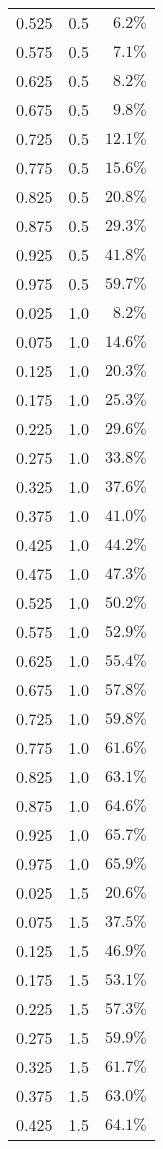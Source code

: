 \begin{longtable}{rrr}
0.525 & 0.5 & $6.2\%$ \\ 
0.575 & 0.5 & $7.1\%$ \\ 
0.625 & 0.5 & $8.2\%$ \\ 
0.675 & 0.5 & $9.8\%$ \\ 
0.725 & 0.5 & $12.1\%$ \\ 
0.775 & 0.5 & $15.6\%$ \\ 
0.825 & 0.5 & $20.8\%$ \\ 
0.875 & 0.5 & $29.3\%$ \\ 
0.925 & 0.5 & $41.8\%$ \\ 
0.975 & 0.5 & $59.7\%$ \\ 
0.025 & 1.0 & $8.2\%$ \\ 
0.075 & 1.0 & $14.6\%$ \\ 
0.125 & 1.0 & $20.3\%$ \\ 
0.175 & 1.0 & $25.3\%$ \\ 
0.225 & 1.0 & $29.6\%$ \\ 
0.275 & 1.0 & $33.8\%$ \\ 
0.325 & 1.0 & $37.6\%$ \\ 
0.375 & 1.0 & $41.0\%$ \\ 
0.425 & 1.0 & $44.2\%$ \\ 
0.475 & 1.0 & $47.3\%$ \\ 
0.525 & 1.0 & $50.2\%$ \\ 
0.575 & 1.0 & $52.9\%$ \\ 
0.625 & 1.0 & $55.4\%$ \\ 
0.675 & 1.0 & $57.8\%$ \\ 
0.725 & 1.0 & $59.8\%$ \\ 
0.775 & 1.0 & $61.6\%$ \\ 
0.825 & 1.0 & $63.1\%$ \\ 
0.875 & 1.0 & $64.6\%$ \\ 
0.925 & 1.0 & $65.7\%$ \\ 
0.975 & 1.0 & $65.9\%$ \\ 
0.025 & 1.5 & $20.6\%$ \\ 
0.075 & 1.5 & $37.5\%$ \\ 
0.125 & 1.5 & $46.9\%$ \\ 
0.175 & 1.5 & $53.1\%$ \\ 
0.225 & 1.5 & $57.3\%$ \\ 
0.275 & 1.5 & $59.9\%$ \\ 
0.325 & 1.5 & $61.7\%$ \\ 
0.375 & 1.5 & $63.0\%$ \\ 
0.425 & 1.5 & $64.1\%$ \\ 

\end{longtable}
